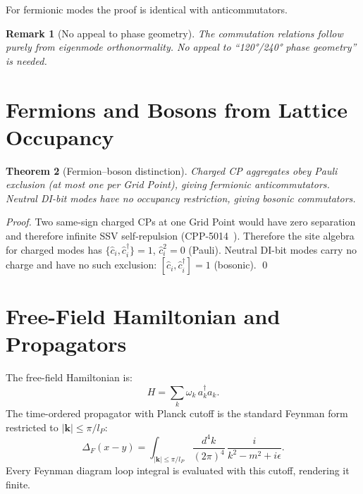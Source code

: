 \documentclass[11pt,letterpaper]{article}
\newtheorem{theorem}{Theorem}[section]
\newtheorem{remark}[theorem]{Remark}
\newcommand{\lP}{l_P}
\begin{document}
For fermionic modes the proof is identical with anticommutators.

\begin{remark}[No appeal to phase geometry]
The commutation relations follow purely from eigenmode orthonormality.
No appeal to ``120°/240° phase geometry'' is needed.
\end{remark}

\section{Fermions and Bosons from Lattice Occupancy}

\begin{theorem}[Fermion--boson distinction]
\label{thm:fermboson}
Charged CP aggregates obey Pauli exclusion (at most one per Grid
Point), giving fermionic anticommutators.  Neutral DI-bit modes have
no occupancy restriction, giving bosonic commutators.
\end{theorem}

\begin{proof}
Two same-sign charged CPs at one Grid Point would have zero separation
and therefore infinite SSV self-repulsion (CPP-5014~\cite{cpp5014}).
Therefore the site algebra for charged modes has
$\{\hat{c}_i,\hat{c}_i^\dagger\} = 1$, $\hat{c}_i^2 = 0$ (Pauli).
Neutral DI-bit modes carry no charge and have no such exclusion:
$[\hat{c}_i,\hat{c}_i^\dagger] = 1$ (bosonic). \qed
\end{proof}

\section{Free-Field Hamiltonian and Propagators}

The free-field Hamiltonian is:
\begin{equation}
H = \sum_k \omega_k\,a_k^\dagger a_k.
\label{eq:Hfree}
\end{equation}
The time-ordered propagator with Planck cutoff is the standard Feynman
form restricted to $|\mathbf{k}|\le\pi/\lP$:
\begin{equation}
\Delta_F(x-y) = \int_{|\mathbf{k}|\le\pi/\lP}
\frac{d^4k}{(2\pi)^4}\,\frac{i}{k^2-m^2+i\epsilon}.
\label{eq:propagator}
\end{equation}
Every Feynman diagram loop integral is evaluated with this cutoff,
rendering it finite.
\end{document}
